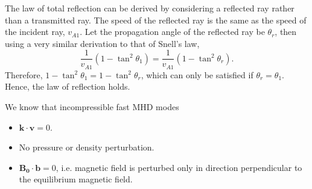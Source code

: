 \documentclass[12pt]{article}
\begin{document}
	The law of total reflection can be derived by considering a reflected ray rather than a transmitted ray. The speed of the reflected ray is the same as the speed of the incident ray, $v_{A1}$. Let the propagation angle of the reflected ray be $\theta_r$, then using a very similar derivation to that of Snell's law,
	\begin{equation}
	\frac{1}{v_{A1}}\left( 1 - \tan^2{\theta_1} \right) = \frac{1}{v_{A1}}\left( 1 - \tan^2{\theta_r} \right).
	\end{equation}
	Therefore, $1 - \tan^2{\theta_1} = 1 - \tan^2{\theta_r}$, which can only be satisfied if $\theta_r = \theta_1$. Hence, the law of reflection holds.
	
	We know that incompressible fast MHD modes 
	
	\begin{itemize}
		\item $\mathbf{k} \cdot \mathbf{v} = 0$.
		\item No pressure or density perturbation.
		\item $\mathbf{B_0} \cdot \mathbf{b} = 0$, i.e. magnetic field is perturbed only in direction perpendicular to the equilibrium magnetic field.
	\end{itemize}




  
\end{document}
